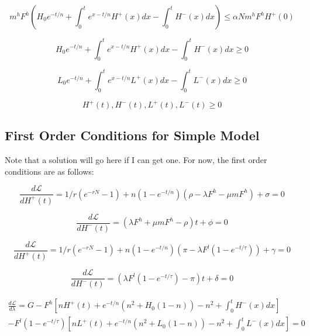 \documentclass{easychithesis}
\newcommand{\Lagr}{\mathcal{L}}
\begin{document}
\begin{equation}\label{eq:analyticalEmit}
m^hF^h\left (H_0 e^{-t/n} + \int_0^t e^{x-t/n} H^+(x) dx - \int_0^t H^-(x)dx \right) \leq \alpha N m^h F^h H^+(0)
\end{equation}

\begin{equation}\label{eq:analyticalHCapConstraint}
H_0 e^{-t/n} + \int_0^t e^{x-t/n} H^+(x) dx - \int_0^t H^-(x)dx \geq 0 
\end{equation}

\begin{equation}\label{eq:analyticalLCapConstraint}
L_0 e^{-t/n} + \int_0^t e^{x-t/n} L^+(x) dx - \int_0^t L^-(x)dx \geq 0 
\end{equation}

\begin{equation}\label{eq:analyticalDecisionVarConstraint}
H^+(t), H^-(t), L^+(t), L^-(t) \geq 0
\end{equation}


\subsection{First Order Conditions for Simple Model}

Note that a solution will go here if I can get one. For now, the first order conditions are as follows:

\begin{equation}\label{eq:dLdH+}
\frac{d\Lagr}{dH^+(t)} = 1/r(e^{-rN} -1) + n(1-e^{-t/n})(\rho - \lambda F^h -\mu m F^h) + \sigma = 0
\end{equation}

\begin{equation}\label{eq:dLdH-}
\frac{d\Lagr}{dH^-(t)} = (\lambda F^h +\mu m F^h - \rho)t + \phi = 0
\end{equation}

\begin{equation}\label{eq:dLdL+}
\frac{d\Lagr}{dH^+(t)} = 1/r(e^{-rN} -1) + n(1-e^{-t/n})(\pi - \lambda F^l(1-e^{-t/\tau})) + \gamma = 0
\end{equation}

\begin{equation}\label{eq:dLdL-}
\frac{d\Lagr}{dH^-(t)} = (\lambda F^l(1-e^{-t/\tau}) - \pi)t + \delta = 0
\end{equation}

\begin{multline}\label{eq:dLdlambda}
\frac{d\Lagr}{d\lambda} = G - F^h\left[nH^+(t) + e^{-t/n}(n^2 + H_0(1-n)) - n^2 + \int_0^tH^-(x)dx\right] \\ - F^l (1-e^{-t/\tau})\left[nL^+(t) + e^{-t/n}(n^2 + L_0(1-n)) - n^2 + \int_0^tL^-(x)dx\right] = 0
\end{multline}
\end{document}
